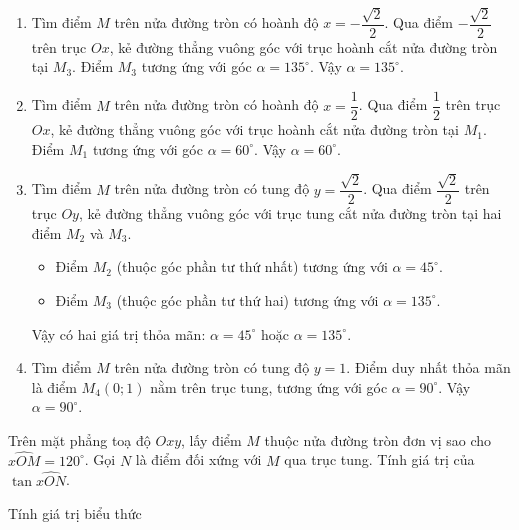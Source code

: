 \begin{vd}
{		\begin{enumerate}
			\item[a)] Tìm điểm $M$ trên nửa đường tròn có hoành độ $x = -\dfrac{\sqrt{2}}{2}$. Qua điểm $-\dfrac{\sqrt{2}}{2}$ trên trục $Ox$, kẻ đường thẳng vuông góc với trục hoành cắt nửa đường tròn tại $M_3$. Điểm $M_3$ tương ứng với góc $\alpha = 135^\circ$. Vậy $\alpha = 135^\circ$.
			
			\item[b)] Tìm điểm $M$ trên nửa đường tròn có hoành độ $x = \dfrac{1}{2}$. Qua điểm $\dfrac{1}{2}$ trên trục $Ox$, kẻ đường thẳng vuông góc với trục hoành cắt nửa đường tròn tại $M_1$. Điểm $M_1$ tương ứng với góc $\alpha = 60^\circ$. Vậy $\alpha = 60^\circ$.
			
			\item[c)] Tìm điểm $M$ trên nửa đường tròn có tung độ $y = \dfrac{\sqrt{2}}{2}$. Qua điểm $\dfrac{\sqrt{2}}{2}$ trên trục $Oy$, kẻ đường thẳng vuông góc với trục tung cắt nửa đường tròn tại hai điểm $M_2$ và $M_3$. 
			\begin{itemize}
				\item Điểm $M_2$ (thuộc góc phần tư thứ nhất) tương ứng với $\alpha = 45^\circ$.
				\item Điểm $M_3$ (thuộc góc phần tư thứ hai) tương ứng với $\alpha = 135^\circ$.
			\end{itemize}
			Vậy có hai giá trị thỏa mãn: $\alpha = 45^\circ$ hoặc $\alpha = 135^\circ$.
			
			\item[d)] Tìm điểm $M$ trên nửa đường tròn có tung độ $y = 1$. Điểm duy nhất thỏa mãn là điểm $M_4(0; 1)$ nằm trên trục tung, tương ứng với góc $\alpha = 90^\circ$. Vậy $\alpha = 90^\circ$.
		\end{enumerate}
	}
	\end{vd} 
\begin{vd}
	Trên mặt phẳng toạ độ $Oxy$, lấy điểm $M$ thuộc nửa đường tròn đơn vị sao cho $\widehat{xOM}=120^{\circ}$. Gọi $N$ là điểm đối xứng với $M$ qua trục tung. Tính giá trị của $\tan\widehat{xON}$.
\end{vd} 
\begin{dang}{Tính giá trị biểu thức}
\end{dang}

